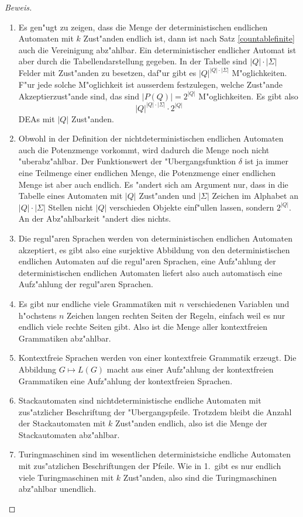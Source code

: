 \begin{proof}[Beweis]
\begin{enumerate}
\item Es gen"ugt zu zeigen, dass die Menge der deterministischen
endlichen Automaten mit $k$ Zust"anden endlich ist, dann ist nach
Satz \ref{countablefinite} auch die Vereinigung abz"ahlbar. Ein
deterministischer endlicher Automat ist aber durch die Tabellendarstellung
gegeben. In der Tabelle sind $|Q|\cdot|\Sigma|$ Felder mit Zust"anden
zu besetzen, daf"ur gibt es $|Q|^{|Q|\cdot|\Sigma|}$ M"oglichkeiten.
F"ur jede solche M"oglichkeit ist ausserdem festzulegen, welche Zust"ande
Akzeptierzust"ande sind, das sind $|P(Q)|=2^{|Q|}$ M"oglichkeiten. Es gibt
also
\[
|Q|^{|Q|\cdot|\Sigma|}\cdot 2^{|Q|}
\]
DEAs mit $|Q|$ Zust"anden.
\item Obwohl in der Definition der nichtdeterministischen endlichen
Automaten auch die Potenzmenge vorkommt, wird dadurch die Menge
noch nicht "uber\-abz"ahlbar. Der Funktionswert der "Ubergangsfunktion
$\delta$ ist ja immer eine Teilmenge einer endlichen Menge, die Potenzmenge
einer endlichen Menge ist aber auch endlich. Es "andert sich am Argument
nur, dass in die Tabelle eines Automaten mit $|Q|$ Zust"anden und
$|\Sigma|$ Zeichen im Alphabet an $|Q|\cdot|\Sigma|$ Stellen
nicht $|Q|$ verschieden Objekte einf"ullen lassen, sondern $2^{|Q|}$.
An der Abz"ahlbarkeit "andert dies nichts.
\item Die regul"aren Sprachen werden von deterministischen endlichen
Automaten akzeptiert, es gibt also eine surjektive Abbildung von
den deterministischen endlichen Automaten auf die regul"aren Sprachen, 
eine Aufz"ahlung der deterministischen endlichen Automaten liefert also
auch automatisch eine Aufz"ahlung der regul"aren Sprachen.
\item Es gibt nur endliche viele Grammatiken mit $n$ verschiedenen
Variablen und h"ochstens $n$ Zeichen langen rechten Seiten der Regeln,
einfach weil es nur endlich viele rechte Seiten gibt. Also ist die
Menge aller kontextfreien Grammatiken abz"ahlbar.
\item Kontextfreie Sprachen werden von einer kontextfreie Grammatik
erzeugt. Die Abbildung $G\mapsto L(G)$ macht aus einer Aufz"ahlung
der kontextfreien Grammatiken eine Aufz"ahlung der kontextfreien Sprachen.
\item Stackautomaten sind nichtdeterministische endliche Automaten mit 
zus"atzlicher Beschriftung der "Ubergangspfeile. Trotzdem bleibt die
Anzahl der Stackautomaten mit $k$ Zust"anden endlich, also ist die
Menge der Stackautomaten abz"ahlbar.
\item Turingmaschinen sind im wesentlichen deterministsiche endliche Automaten
mit zus"atzlichen Beschriftungen der Pfeile. Wie in 1.~gibt es nur endlich
viele Turingmaschinen mit $k$ Zust"anden, also sind die Turingmaschinen
abz"ahlbar unendlich.
\end{enumerate}
\end{proof}

